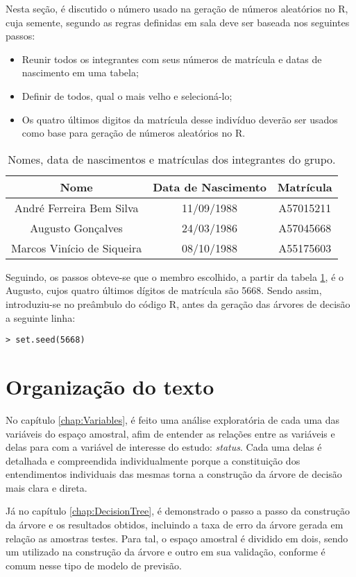 Nesta seção, é discutido o número usado na geração de números aleatórios no R, cuja semente, segundo as regras definidas em sala deve ser baseada nos seguintes passos:

\begin{itemize}
  \item Reunir todos os integrantes com seus números de matrícula e datas
    de nascimento em uma tabela;
  \item Definir de todos, qual o mais velho e selecioná-lo;
  \item Os quatro últimos digitos da matrícula desse indivíduo deverão ser
    usados como base para geração de números aleatórios no R.
\end{itemize}

\begin{table}[h]
  \begin{centering}
    \begin{tabular}{c|c|c}
      \hline 
      Nome & Data de Nascimento & Matrícula\tabularnewline
      \hline 
      André Ferreira Bem Silva & 11/09/1988 & A57015211\tabularnewline
      \hline 
      Augusto Gonçalves & 24/03/1986 & A57045668\tabularnewline
      \hline 
      Marcos Vinício de Siqueira & 08/10/1988 & A55175603\tabularnewline
      \hline 
    \end{tabular}
  \par\end{centering}

  \caption{\label{tab:Integrantes}Nomes, data de nascimentos e matrículas dos integrantes do grupo.}
\end{table}

Seguindo, os passos obteve-se que o membro escolhido, a partir da tabela \ref{tab:Integrantes}, é o Augusto, cujos quatro últimos dígitos de matrícula são 5668. Sendo assim, introduziu-se no preâmbulo do código R, antes da geração das árvores de decisão a seguinte linha:
\begin{verbatim}
> set.seed(5668)
\end{verbatim}

\section{Organização do texto}

No capítulo \ref{chap:Variables}, é feito uma análise exploratória de cada uma das variáveis do espaço amostral, afim de entender as relações entre as variáveis e delas para com a variável de interesse do estudo: \emph{status}. Cada uma delas é detalhada e compreendida individualmente porque a constituição dos entendimentos individuais das mesmas torna a construção da árvore de decisão mais clara e direta.

Já no capítulo \ref{chap:DecisionTree}, é demonstrado o passo a passo da construção da árvore e os resultados obtidos, incluindo a taxa de erro da árvore gerada em relação as amostras testes. Para tal, o espaço amostral é dividido em dois, sendo um utilizado na construção da árvore e outro em sua validação, conforme é comum nesse tipo de modelo de previsão.
